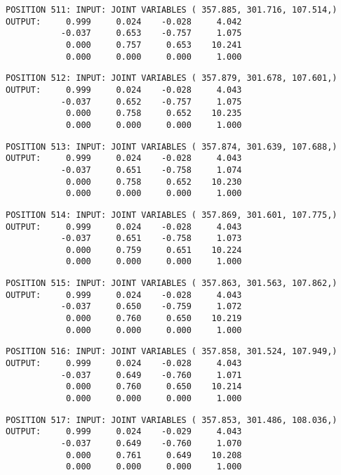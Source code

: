 \begin{verbatim}
POSITION 511: INPUT: JOINT VARIABLES ( 357.885, 301.716, 107.514,)
OUTPUT:     0.999     0.024    -0.028     4.042
           -0.037     0.653    -0.757     1.075
            0.000     0.757     0.653    10.241
            0.000     0.000     0.000     1.000
\end{verbatim} \pagebreak[1]\begin{verbatim}
POSITION 512: INPUT: JOINT VARIABLES ( 357.879, 301.678, 107.601,)
OUTPUT:     0.999     0.024    -0.028     4.043
           -0.037     0.652    -0.757     1.075
            0.000     0.758     0.652    10.235
            0.000     0.000     0.000     1.000
\end{verbatim} \pagebreak[1]\begin{verbatim}
POSITION 513: INPUT: JOINT VARIABLES ( 357.874, 301.639, 107.688,)
OUTPUT:     0.999     0.024    -0.028     4.043
           -0.037     0.651    -0.758     1.074
            0.000     0.758     0.652    10.230
            0.000     0.000     0.000     1.000
\end{verbatim} \pagebreak[1]\begin{verbatim}
POSITION 514: INPUT: JOINT VARIABLES ( 357.869, 301.601, 107.775,)
OUTPUT:     0.999     0.024    -0.028     4.043
           -0.037     0.651    -0.758     1.073
            0.000     0.759     0.651    10.224
            0.000     0.000     0.000     1.000
\end{verbatim} \pagebreak[1]\begin{verbatim}
POSITION 515: INPUT: JOINT VARIABLES ( 357.863, 301.563, 107.862,)
OUTPUT:     0.999     0.024    -0.028     4.043
           -0.037     0.650    -0.759     1.072
            0.000     0.760     0.650    10.219
            0.000     0.000     0.000     1.000
\end{verbatim} \pagebreak[1]\begin{verbatim}
POSITION 516: INPUT: JOINT VARIABLES ( 357.858, 301.524, 107.949,)
OUTPUT:     0.999     0.024    -0.028     4.043
           -0.037     0.649    -0.760     1.071
            0.000     0.760     0.650    10.214
            0.000     0.000     0.000     1.000
\end{verbatim} \pagebreak[1]\begin{verbatim}
POSITION 517: INPUT: JOINT VARIABLES ( 357.853, 301.486, 108.036,)
OUTPUT:     0.999     0.024    -0.029     4.043
           -0.037     0.649    -0.760     1.070
            0.000     0.761     0.649    10.208
            0.000     0.000     0.000     1.000
\end{verbatim} \pagebreak[1]\begin{verbatim}

\end{verbatim}
